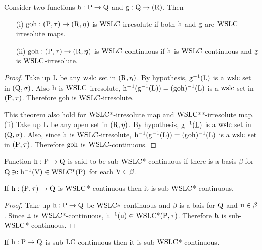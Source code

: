 \begin{thm}\label{thm7.4.4}
Consider two functions $\mathrm{h}: \mathrm{P} \to \mathrm{Q}$ and $\mathrm{g}: \mathrm{Q}\to (\mathrm{R})$. Then
\begin{itemize}
\item[(i)] $\mathrm{goh} : (\mathrm{P}, \tau) \to (\mathrm{R}, \eta)$ is $\mathrm{WSLC}$-irresolute if both $\mathrm{h}$ and $\mathrm{g}$ are $\mathrm{WSLC}$-irresolute maps.
\item[(ii)] $\mathrm{goh}: (\mathrm{P}, \tau) \to (\mathrm{R}, \eta)$ is $\mathrm{WSLC}$-continuous if $\mathrm{h}$ is $\mathrm{WSLC}$-continuous and $\mathrm{g}$ is $\mathrm{WSLC}$-irresolute.
\end{itemize}
\end{thm}

\begin{proof}
Take up $\mathrm{L}$ be any $\mathrm{ws}\mathrm{lc}$ set in $(\mathrm{R}, \eta)$. By hypothesis, $\mathrm{g}^{-1} (\mathrm{L})$ is a $\mathrm{ws}\mathrm{lc}$ set in $(\mathrm{Q}, \sigma)$. Also $\mathrm{h}$ is $\mathrm{WSLC}$-irresolute, $\mathrm{h}^{-1} (\mathrm{g}^{-1} (\mathrm{L})) = (\mathrm{goh})^{-1} (\mathrm{L})$ is a $\mathrm{ws}\mathrm{lc}$ set in $(\mathrm{P}, \tau)$. Therefore goh is $\mathrm{WSLC}$-irresolute.

This theorem also hold for $\mathrm{WSLC}$*-irresolute map and $\mathrm{WSLC}${*}{*}-irresolute map. (ii) Take up $\mathrm{L}$ be any open set in $(\mathrm{R}, \eta)$. By hypothesis, $\mathrm{g}^{-1} (\mathrm{L})$ is a $\mathrm{ws}\mathrm{lc}$ set in $(\mathrm{Q}, \sigma)$. Also, since $\mathrm{h}$ is $\mathrm{WSLC}$-irresolute, $\mathrm{h}^{-1} (\mathrm{g}^{-1} (\mathrm{L})) = (\mathrm{goh})^{-1} (\mathrm{L})$ is a $\mathrm{ws}\mathrm{lc}$ set in $(\mathrm{P}, \tau)$. Therefore $\mathrm{goh}$ is $\mathrm{WSLC}$-continuous.
\end{proof}

\begin{dfn}\label{defi7.4.2}
Function $\mathrm{h}: \mathrm{P} \to \mathrm{Q}$ is said to be sub-$\mathrm{WSLC}$*-continuous if there is a basis $\beta$ for $\mathrm{Q}\ni: \mathrm{h}^{-1} (\mathrm{V}) \in \mathrm{WSLC}\text{*}(\mathrm{P})$ for each $\mathrm{V} \in \beta$.
\end{dfn}

\begin{thm}\label{thm7.4.5}
If $\mathrm{h} : (\mathrm{P}, \tau) \to \mathrm{Q}$ is $\mathrm{WSLC}$*-continuous then it is sub-$\mathrm{WSLC}$*-continuous.
\end{thm}

\begin{proof}
Take up $\mathrm{h}: \mathrm{P} \to \mathrm{Q}$ be $\mathrm{WSLC}*$-continuous and $\beta$ is a bais for $\mathrm{Q}$ and $\mathrm{u} \in \beta$. Since $\mathrm{h}$ is $\mathrm{WSLC}$*-continuous, $\mathrm{h}^{-1}(\mathrm{u}) \in \mathrm{WSLC} \text{*} (\mathrm{P}, \tau)$. Therefore $\mathrm{h}$ is sub-$\mathrm{WSLC}$*-continuous.
\end{proof}

\begin{thm}\label{thm7.4.6}
If $\mathrm{h}: \mathrm{P} \to \mathrm{Q}$ is sub-$\mathrm{LC}$-continuous then it is sub-$\mathrm{WSLC}$*-continuous.
\end{thm}

